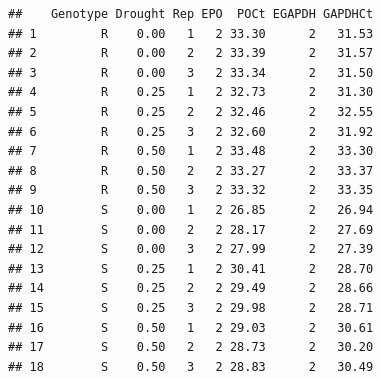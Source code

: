 \documentclass[
]{article}
\newenvironment{Shaded}{\begin{snugshade}}{\end{snugshade}}
\newcommand{\AttributeTok}[1]{\textcolor[rgb]{0.13,0.29,0.53}{#1}}
\newcommand{\DecValTok}[1]{\textcolor[rgb]{0.00,0.00,0.81}{#1}}
\newcommand{\FunctionTok}[1]{\textcolor[rgb]{0.13,0.29,0.53}{\textbf{#1}}}
\newcommand{\NormalTok}[1]{#1}
\newcommand{\OtherTok}[1]{\textcolor[rgb]{0.56,0.35,0.01}{#1}}
\newcommand{\SpecialCharTok}[1]{\textcolor[rgb]{0.81,0.36,0.00}{\textbf{#1}}}
\newcommand{\StringTok}[1]{\textcolor[rgb]{0.31,0.60,0.02}{#1}}
\begin{document}
\begin{verbatim}
##    Genotype Drought Rep EPO  POCt EGAPDH GAPDHCt
## 1         R    0.00   1   2 33.30      2   31.53
## 2         R    0.00   2   2 33.39      2   31.57
## 3         R    0.00   3   2 33.34      2   31.50
## 4         R    0.25   1   2 32.73      2   31.30
## 5         R    0.25   2   2 32.46      2   32.55
## 6         R    0.25   3   2 32.60      2   31.92
## 7         R    0.50   1   2 33.48      2   33.30
## 8         R    0.50   2   2 33.27      2   33.37
## 9         R    0.50   3   2 33.32      2   33.35
## 10        S    0.00   1   2 26.85      2   26.94
## 11        S    0.00   2   2 28.17      2   27.69
## 12        S    0.00   3   2 27.99      2   27.39
## 13        S    0.25   1   2 30.41      2   28.70
## 14        S    0.25   2   2 29.49      2   28.66
## 15        S    0.25   3   2 29.98      2   28.71
## 16        S    0.50   1   2 29.03      2   30.61
## 17        S    0.50   2   2 28.73      2   30.20
## 18        S    0.50   3   2 28.83      2   30.49
\end{verbatim}

\begin{Shaded}
\end{Shaded}
\end{document}
